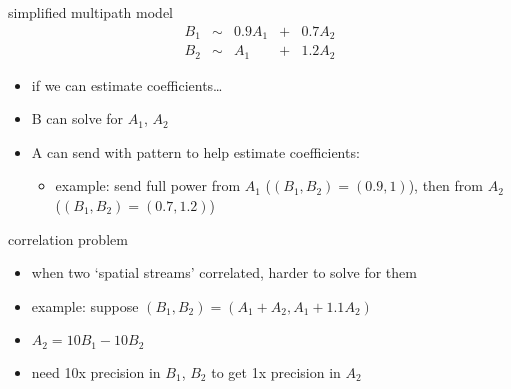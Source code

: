 \begin{frame}{simplified multipath model}
\begin{align*}
B_1 &\sim& 0.9A_1 &+& 0.7A_2 \\
B_2 &\sim& A_1 &+& 1.2A_2 
\end{align*}
\begin{itemize}
\item if we can estimate coefficients\ldots
\item B can solve for $A_1$, $A_2$
\vspace{.5cm}
\item A can send with pattern to help estimate coefficients:
    \begin{itemize}
    \item example: send full power from $A_1$ ($(B_1,B_2)=(0.9, 1)$), then from $A_2$ ($(B_1,B_2)=(0.7, 1.2)$)
    \end{itemize}
\end{itemize}
\end{frame}

\begin{frame}{correlation problem}
    \begin{itemize}
    \item when two `spatial streams' correlated, harder to solve for them
    \item example: suppose $(B_1,B_2)=(A_1+A_2,A_1+1.1A_2)$
    \vspace{.5cm}
    \item $A_2=10B_1-10B_2$
    \item need 10x precision in $B_1$, $B_2$ to get 1x precision in $A_2$
    \end{itemize}
\end{frame}
